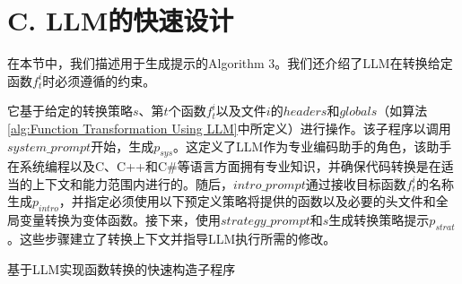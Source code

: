 \section{C. LLM的快速设计}
在本节中，我们描述用于生成提示的Algorithm 3。我们还介绍了LLM在转换给定函数$f_{t}^{i}$时必须遵循的约束。

它基于给定的转换策略$s$、第$t$个函数$f_{t}^{i}$以及文件$i$的$headers$和$globals$（如算法\ref{alg:Function Transformation Using LLM}中所定义）进行操作。该子程序以调用$system\_prompt$开始，生成$p_{sys}$。这定义了LLM作为专业编码助手的角色，该助手在系统编程以及C、C++和C\#等语言方面拥有专业知识，并确保代码转换是在适当的上下文和能力范围内进行的。随后，$intro\_prompt$通过接收目标函数$f_{t}^{i}$的名称生成$p_{intro}$，并指定必须使用以下预定义策略将提供的函数以及必要的头文件和全局变量转换为变体函数。接下来，使用$strategy\_prompt$和$s$生成转换策略提示$p_{strat}$。这些步骤建立了转换上下文并指导LLM执行所需的修改。

\begin{algorithm}[htbp]
	\caption{基于LLM实现函数转换的快速构造子程序\label{alg:Prompt Construction Subroutine for LLM-based Function Transformation}}
\end{algorithm}